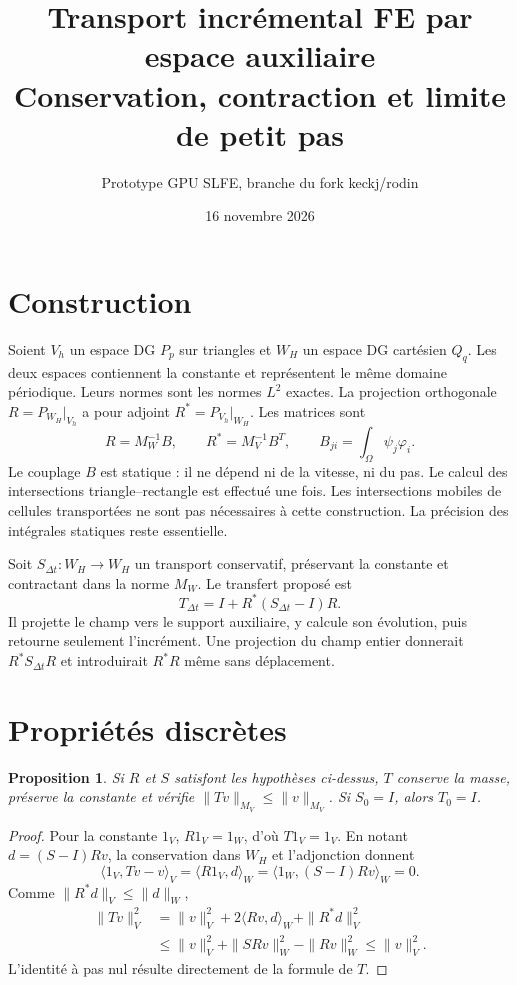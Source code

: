 \documentclass[11pt,a4paper]{article}
\title{Transport incrémental FE par espace auxiliaire\\Conservation, contraction et limite de petit pas}
\author{Prototype GPU SLFE, branche du fork keckj/rodin}
\date{16 novembre 2026}
\newtheorem{proposition}{Proposition}
\begin{document}
\maketitle

\section{Construction}
Soient $V_h$ un espace DG $P_p$ sur triangles et $W_H$ un espace DG
cartésien $Q_q$. Les deux espaces contiennent la constante et représentent
le même domaine périodique. Leurs normes sont les normes $L^2$ exactes.
La projection orthogonale $R=P_{W_H}|_{V_h}$ a pour adjoint
$R^*=P_{V_h}|_{W_H}$. Les matrices sont
\[
 R=M_W^{-1}B,\qquad R^*=M_V^{-1}B^T,
 \qquad B_{ji}=\int_\Omega \psi_j\varphi_i.
\]
Le couplage $B$ est statique : il ne dépend ni de la vitesse, ni du pas.
Le calcul des intersections triangle--rectangle est effectué une fois.
Les intersections mobiles de cellules transportées ne sont pas nécessaires
à cette construction. La précision des intégrales statiques reste essentielle.

Soit $S_{\Delta t}:W_H\to W_H$ un transport conservatif, préservant la
constante et contractant dans la norme $M_W$. Le transfert proposé est
\[
 \boxed{T_{\Delta t}=I+R^*(S_{\Delta t}-I)R.}
\]
Il projette le champ vers le support auxiliaire, y calcule son évolution,
puis retourne seulement l'incrément. Une projection du champ entier
donnerait $R^*S_{\Delta t}R$ et introduirait $R^*R$ même sans déplacement.

\section{Propriétés discrètes}
\begin{proposition}
Si $R$ et $S$ satisfont les hypothèses ci-dessus, $T$ conserve la masse,
préserve la constante et vérifie $\|Tv\|_{M_V}\leq\|v\|_{M_V}$.
Si $S_0=I$, alors $T_0=I$.
\end{proposition}
\begin{proof}
Pour la constante $1_V$, $R1_V=1_W$, d'où $T1_V=1_V$.
En notant $d=(S-I)Rv$, la conservation dans $W_H$ et l'adjonction donnent
\[
 \langle1_V,Tv-v\rangle_V=\langle R1_V,d\rangle_W
 =\langle1_W,(S-I)Rv\rangle_W=0.
\]
Comme $\|R^*d\|_V\leq\|d\|_W$,
\begin{align*}
 \|Tv\|_V^2
 &=\|v\|_V^2+2\langle Rv,d\rangle_W+\|R^*d\|_V^2\\
 &\leq\|v\|_V^2+\|SRv\|_W^2-\|Rv\|_W^2
 \leq\|v\|_V^2.
\end{align*}
L'identité à pas nul résulte directement de la formule de $T$.
\end{proof}
\end{document}
